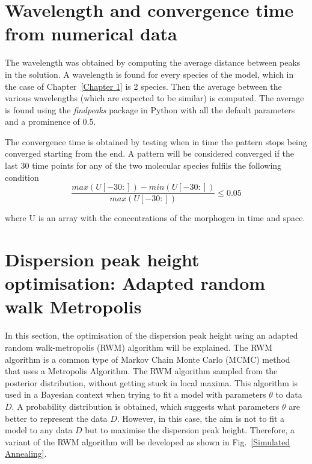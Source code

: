 \section{Wavelength and convergence time from numerical data}\label{Wavelength and convergence time from numerical data}
The wavelength was obtained by computing the average distance between peaks in the solution.
A wavelength is found for every species of the model, which in the case of Chapter~\ref{Chapter 1} is 2 species.
Then the average between the various wavelengths (which are expected to be similar) is computed.
The average is found using the \textit{findpeaks} package in Python with all the default parameters and a prominence of 0.5.

The convergence time is obtained by testing when in time the pattern stops being converged starting from the end.
A pattern will be considered converged if the last 30 time points for any of the two molecular species fulfils the following condition
\begin{equation}
    \frac{max(U[-30:]) - min(U[-30:])}{max(U[-30:])} \leq 0.05
\end{equation}

where U is an array with the concentrations of the morphogen in time and space.
\section{Dispersion peak height optimisation: Adapted random walk Metropolis}\label{dispersion_peak_optimisation}
In this section, the optimisation of the dispersion peak height using an adapted random walk-metropolis (RWM) algorithm will be explained.
The RWM algorithm is a common type of Markov Chain Monte Carlo (MCMC) method that uses a Metropolis Algorithm.
The RWM algorithm sampled from the posterior distribution, without getting stuck in local maxima.
This algorithm is used in a Bayesian context when trying to fit a model with parameters $\theta$ to data $D$.
A probability distribution is obtained, which suggests what parameters $\theta$ are better to represent the data $D$.
However, in this case, the aim is not to fit a model to any data $D$ but to maximise the dispersion peak height.
Therefore, a variant of the RWM algorithm will be developed as shown in Fig.~\ref{Simulated Annealing}.

